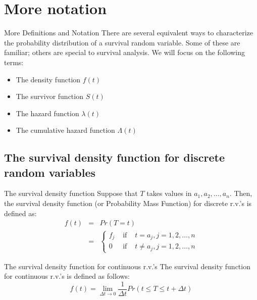 \documentclass[envcountsect, 10pt, portrait, palatino]{beamer}
\begin{document}
\section{More notation}
\begin{frame}{More Definitions and Notation}
There are several equivalent ways to characterize the
probability distribution of a survival random variable.
Some of these are familiar; others are special to survival
analysis.  We will focus on the following terms:

\begin{itemize}
\item The density function $f(t)$
\item The survivor function $S(t)$
\item The hazard function $\lambda(t)$
\item The cumulative hazard function $\Lambda(t)$
\end{itemize}

\end{frame}
\subsection{The survival density function for discrete random variables}
\begin{frame}{The survival density function}
Suppose that $T$ takes values in $a_1,a_2, \ldots, a_n$.  Then, the survival density function (or Probability Mass Function) for discrete r.v.'s is defined as:\\
\begin{eqnarray*}
 f(t) & = &  Pr(T = t) \\[2ex]
 & = & \left\{ \begin{array}{ccc}
 f_j & \mbox{ if } & t=a_j, j=1,2,\ldots,n \\
 0 & \mbox{ if } & t\ne a_j, j=1,2,\ldots,n
 \end{array}
 \right.
 \end{eqnarray*}
\end{frame}
\begin{frame}{The survival density function for continuous r.v.'s}
The survival density function for continuous r.v.'s is defined as follows:\\[2ex]
\[  f(t) = \lim_{\Delta t \rightarrow 0}
 \frac{1}{\Delta t}  Pr(t \le T \le t+\Delta t) \]
\end{frame}
\end{document}
